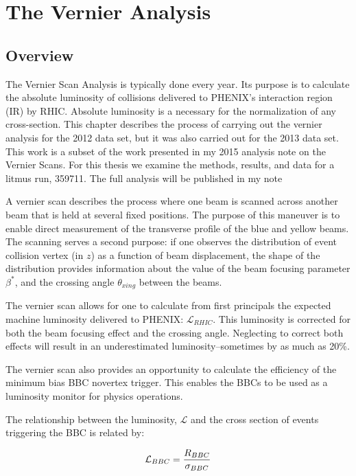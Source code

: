 \chapter{The Vernier Analysis}
\label{ch:vernier_analysis}
\section{Overview}

The Vernier Scan Analysis is typically done every year. Its purpose is to
calculate the absolute luminosity of collisions delivered to PHENIX's
interaction region (IR) by RHIC.  Absolute luminosity is a necessary for the
normalization of any cross-section. This chapter describes the process of
carrying out the vernier analysis for the 2012 data set, but it was also
carried out for the 2013 data set. This work is a subset of the work presented
in my 2015 analysis note on the Vernier Scans. For this thesis we examine the
methods, results, and data for a litmus run, 359711. The full analysis will be
published in my note~\cite{Beaumier2015}

A vernier scan describes the process where one beam is scanned across another
beam that is held at several fixed positions. The purpose of this maneuver is to
enable direct measurement of the transverse profile of the blue and yellow
beams. The scanning serves a second purpose: if one observes the distribution of
event collision vertex (in $z$) as a function of beam displacement, the shape of
the distribution provides information about the value of the beam focusing
parameter $\beta^*$, and the crossing angle $\theta_{xing}$ between the beams.

The vernier scan allows for one to calculate from first principals the expected
machine luminosity delivered to PHENIX: $\mathcal{L}_{RHIC}$. This luminosity is
corrected for both the beam focusing effect and the crossing angle. Neglecting
to correct both effects will result in an underestimated luminosity--sometimes
by as much as 20\%.

The vernier scan also provides an opportunity to calculate the efficiency of the
minimum bias BBC novertex trigger. This enables the BBCs to be used as a
luminosity monitor for physics operations. 

The relationship between the luminosity, $\mathcal{L}$ and the cross section of
events triggering the BBC is related by:

\begin{equation} 
\label{eq:lumi_xsec_simple} 
\mathcal{L}_{BBC} = {R_{BBC}\over\sigma_{BBC}} 
\end{equation}

